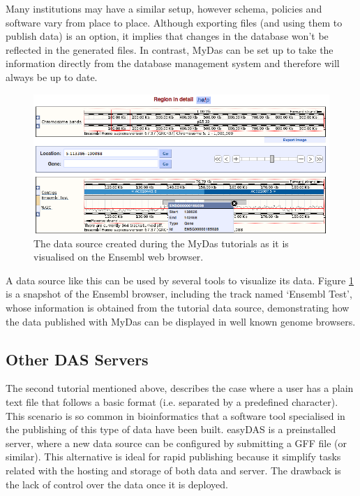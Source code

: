 Many institutions may have a similar setup, however schema, policies and software vary from place to place. Although exporting files (and using them to publish data)  is an option, it implies that changes in the database won't be reflected in the generated files. In contrast, MyDas can be set up to take the information directly from the database management system and therefore will always be up to date.

\begin{figure}[t]
\centering
\includegraphics[width=\textwidth]{figures/MyDasEnsembl.png}
\caption[A MyDas Source as displayed on the Ensembl client.] {The data source created during the MyDas tutorials as it is visualised on the Ensembl web browser.
\label{fig:mydas_example}}
\end{figure}

A data source like this can be used by several tools to visualize its data. Figure \ref{fig:mydas_example} is a snapshot of the Ensembl browser, including the track named `Ensembl Test', whose information is obtained from the tutorial data source, demonstrating how the data published with MyDas can be displayed in well known genome browsers.

\subsection{Other DAS Servers}
The second tutorial mentioned above, describes the case where a user has a plain text file that follows a basic format (i.e. separated by a predefined character). This scenario is so common in bioinformatics that a software tool specialised in the publishing of this type of data have been built. easyDAS\cite{GEL2011}  is a preinstalled server, where a new data source can be configured by submitting a GFF file (or similar). This alternative is ideal for rapid publishing because it simplify tasks related with the hosting and storage of both data and server. The drawback is the lack of control over the data once it is deployed. 

